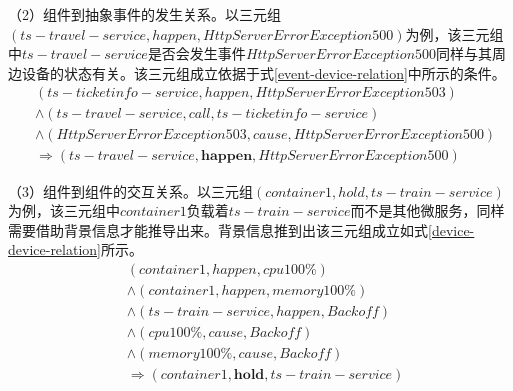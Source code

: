 
（2）组件到抽象事件的发生关系。以三元组$(ts-travel-service, happen, HttpServerError Exception 500)$为例，该三元组中$ts-travel-service$是否会发生事件$HttpServerError$$Exception 500$同样与其周边设备的状态有关。该三元组成立依据于式\ref{event-device-relation}中所示的条件。
\begin{equation}
    \begin{aligned}
        &\left ( ts-ticketinfo-service, happen,  HttpServerError Exception 503\right ) \\
        &\wedge \left ( ts-travel-service, call, ts-ticketinfo-service \right ) \\
        &\wedge \left ( HttpServerError Exception 503, cause, HttpServerError Exception 500 \right ) \\
        &\Rightarrow \left ( ts-travel-service, \boldsymbol{happen}, HttpServerError Exception 500 \right )
    \end{aligned}
\label{event-device-relation}
\end{equation}

（3）组件到组件的交互关系。以三元组$\left( container1, hold, ts-train-service \right)$为例，该三元组中$container1$负载着$ts-train-service$而不是其他微服务，同样需要借助背景信息才能推导出来。背景信息推到出该三元组成立如式\ref{device-device-relation}所示。
\begin{equation}
    \begin{aligned}
        &\left ( container1, happen,  cpu 100\% \right ) \\
        &\wedge \left ( container1, happen,  memory 100\% \right) \\
        &\wedge \left ( ts-train-service, happen,  Backoff \right) \\
        &\wedge \left ( cpu 100\%, cause,  Backoff \right) \\
        &\wedge \left ( memory 100\%, cause,  Backoff \right) \\
        &\Rightarrow \left ( container1, \boldsymbol{hold}, ts-train-service \right )
    \end{aligned}
\label{device-device-relation}
\end{equation}

